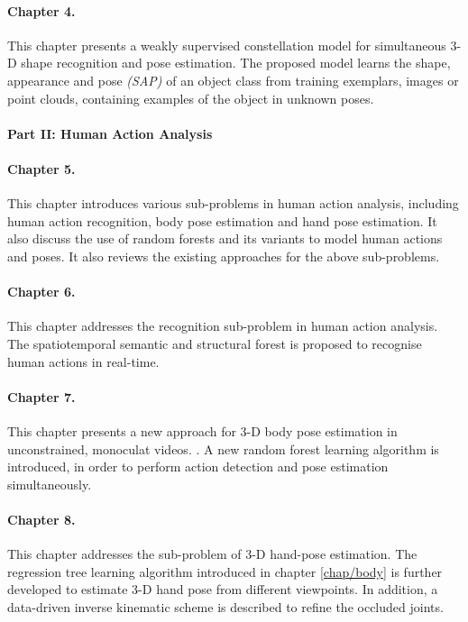 \paragraph{Chapter 4.}
This chapter presents a weakly supervised constellation model for simultaneous 3-D shape recognition and pose estimation. 
The proposed model learns the shape, appearance and pose \emph{(SAP)} of an object class from training exemplars, \eg images or point clouds, containing examples of the object in unknown poses.  

\paragraph{Part II: Human Action Analysis}

\paragraph{Chapter 5.} 
This chapter introduces various sub-problems in human action analysis, including human action recognition, body pose estimation and hand pose estimation. 
It also discuss the use of random forests and its variants to model human actions and poses.    
It also reviews the existing approaches for the above sub-problems. 

\paragraph{Chapter 6.} 
This chapter addresses the recognition sub-problem in human action analysis. The spatiotemporal semantic and structural forest is proposed to recognise human actions in real-time.    

\paragraph{Chapter 7.} 
This chapter presents a new approach for 3-D body pose estimation in unconstrained, monoculat videos. .   
A new random forest learning algorithm is introduced, in order to perform action detection and pose estimation simultaneously. 

\paragraph{Chapter 8.} 
This chapter addresses the sub-problem of 3-D hand-pose estimation. 
The regression tree learning algorithm introduced in chapter \ref{chap/body} is further developed to estimate 3-D hand pose from different viewpoints. 
In addition, a data-driven inverse kinematic scheme is described to refine the occluded joints.

